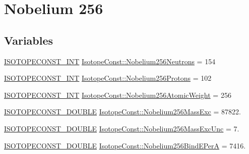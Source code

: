 \hypertarget{group___isotope_const-_nobelium-_no256}{}\section{Nobelium 256}
\label{group___isotope_const-_nobelium-_no256}
\subsection*{Variables}
\begin{DoxyCompactItemize}
\item 
\mbox{\hyperlink{group___isotope_const-_macros_ga5f18360b3e99483a35c32d789e62621c}{I\+S\+O\+T\+O\+P\+E\+C\+O\+N\+S\+T\+\_\+\+I\+NT}} \mbox{\hyperlink{group___isotope_const-_nobelium-_no256_gacc72c3ea872af93b3e410a021d13d5d5}{Isotope\+Const\+::\+Nobelium256\+Neutrons}} = 154
\item 
\mbox{\hyperlink{group___isotope_const-_macros_ga5f18360b3e99483a35c32d789e62621c}{I\+S\+O\+T\+O\+P\+E\+C\+O\+N\+S\+T\+\_\+\+I\+NT}} \mbox{\hyperlink{group___isotope_const-_nobelium-_no256_ga01f63c7478da5d8e6c1de50a7e91f496}{Isotope\+Const\+::\+Nobelium256\+Protons}} = 102
\item 
\mbox{\hyperlink{group___isotope_const-_macros_ga5f18360b3e99483a35c32d789e62621c}{I\+S\+O\+T\+O\+P\+E\+C\+O\+N\+S\+T\+\_\+\+I\+NT}} \mbox{\hyperlink{group___isotope_const-_nobelium-_no256_ga939c0844e828e947d96e5fa1edfd0641}{Isotope\+Const\+::\+Nobelium256\+Atomic\+Weight}} = 256
\item 
\mbox{\hyperlink{group___isotope_const-_macros_ga8f45a7272ce02c0b4c65c44636ed719a}{I\+S\+O\+T\+O\+P\+E\+C\+O\+N\+S\+T\+\_\+\+D\+O\+U\+B\+LE}} \mbox{\hyperlink{group___isotope_const-_nobelium-_no256_ga03603698ef281951b4cc56af8ce17316}{Isotope\+Const\+::\+Nobelium256\+Mass\+Exc}} = 87822.
\item 
\mbox{\hyperlink{group___isotope_const-_macros_ga8f45a7272ce02c0b4c65c44636ed719a}{I\+S\+O\+T\+O\+P\+E\+C\+O\+N\+S\+T\+\_\+\+D\+O\+U\+B\+LE}} \mbox{\hyperlink{group___isotope_const-_nobelium-_no256_ga3c38b33012736688a781a1e29956827a}{Isotope\+Const\+::\+Nobelium256\+Mass\+Exc\+Unc}} = 7.
\item 
\mbox{\hyperlink{group___isotope_const-_macros_ga8f45a7272ce02c0b4c65c44636ed719a}{I\+S\+O\+T\+O\+P\+E\+C\+O\+N\+S\+T\+\_\+\+D\+O\+U\+B\+LE}} \mbox{\hyperlink{group___isotope_const-_nobelium-_no256_ga848b76d0cb75e780745e09ebaa9685d7}{Isotope\+Const\+::\+Nobelium256\+Bind\+E\+PerA}} = 7416.
\item 

\end{DoxyCompactItemize}
